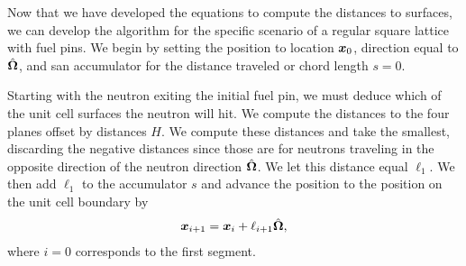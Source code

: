 Now that we have developed the equations to compute the distances to surfaces, we can develop the algorithm for the specific scenario of a regular square lattice with fuel pins. We begin by setting the position to location $\bm{x}_0$, direction equal to $\hat{\mathbf{\Omega}}$, and san accumulator for the distance traveled or chord length $s = 0$. 

Starting with the neutron exiting the initial fuel pin, we must deduce which of the unit cell surfaces the neutron will hit. We compute the distances to the four planes offset by distances $H$. We compute these distances and take the smallest, discarding the negative distances since those are for neutrons traveling in the opposite direction of the neutron direction $\hat{\mathbf{\Omega}}$. We let this distance equal $\ell_1$. We then add $\ell_1$ to the accumulator $s$ and advance the position to the position on the unit cell boundary by
\begin{align}
  \bm{x}_{i+1} = \bm{x}_i + \ell_{i+1} \hat{\mathbf{\Omega}} ,
\end{align}
where $i = 0$ corresponds to the first segment.

